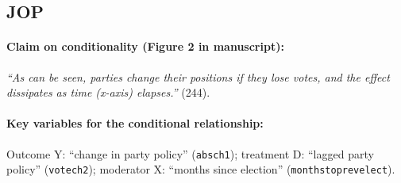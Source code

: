 \documentclass[12pt]{article}
\begin{document}
\clearpage





\subsection{\citet{Somer2009} JOP} \label{somer}



\paragraph{Claim on conditionality (Figure 2 in manuscript):} \emph{``As can be seen, parties change their positions if they lose votes, and the effect dissipates as time (x-axis) elapses.''} (244). 

\paragraph{Key variables for the conditional relationship:} Outcome Y:
``change in party policy'' (\texttt{absch1}); treatment D: ``lagged party policy'' (\texttt{votech2}); moderator X: ``months since election''
(\texttt{monthstoprevelect}).


\newpage
\end{document}
